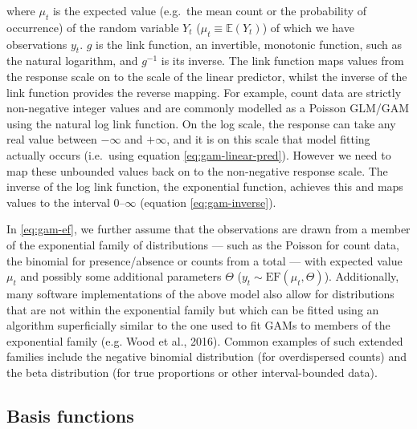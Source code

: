 \documentclass[12pt,]{article}
\begin{document}
where \(\mu_t\) is the expected value (e.g.~the mean count or the
probability of occurrence) of the random variable \(Y_t\)
(\(\mu_t \equiv \mathbb{E}(Y_t)\)) of which we have observations
\(y_t\). \(g\) is the link function, an invertible, monotonic function,
such as the natural logarithm, and \(g^{-1}\) is its inverse. The link
function maps values from the response scale on to the scale of the
linear predictor, whilst the inverse of the link function provides the
reverse mapping. For example, count data are strictly non-negative
integer values and are commonly modelled as a Poisson GLM/GAM using the
natural log link function. On the log scale, the response can take any
real value between \(-\infty\) and \(+\infty\), and it is on this scale
that model fitting actually occurs (i.e.~using equation
\eqref{eq:gam-linear-pred}). However we need to map these unbounded
values back on to the non-negative response scale. The inverse of the
log link function, the exponential function, achieves this and maps
values to the interval 0--\(\infty\) (equation \eqref{eq:gam-inverse}).

In \eqref{eq:gam-ef}, we further assume that the observations are drawn
from a member of the exponential family of distributions --- such as the
Poisson for count data, the binomial for presence/absence or counts from
a total --- with expected value \(\mu_t\) and possibly some additional
parameters \(\Theta\) (\(y_t \sim \text{EF}(\mu_t, \Theta)\)).
Additionally, many software implementations of the above model also
allow for distributions that are not within the exponential family but
which can be fitted using an algorithm superficially similar to the one
used to fit GAMs to members of the exponential family (e.g. Wood et al.,
2016). Common examples of such extended families include the negative
binomial distribution (for overdispersed counts) and the beta
distribution (for true proportions or other interval-bounded data).

\subsection{Basis functions}\label{basis-functions}
\end{document}
